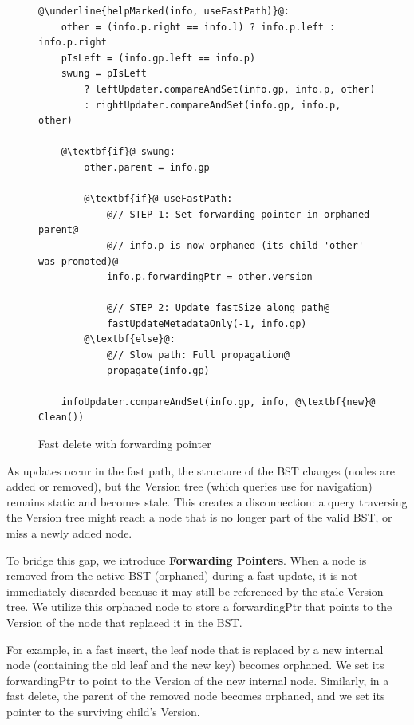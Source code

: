 \documentclass[acmsmall,screen,nonacm]{acmart}
\newcommand{\codestyle}[1]{{{\fontsize{9}{10}\ttfamily #1}}}
\begin{document}
\begin{figure}[H]
\begin{lstlisting}
@\underline{helpMarked(info, useFastPath)}@:
    other = (info.p.right == info.l) ? info.p.left : info.p.right
    pIsLeft = (info.gp.left == info.p)
    swung = pIsLeft
        ? leftUpdater.compareAndSet(info.gp, info.p, other)
        : rightUpdater.compareAndSet(info.gp, info.p, other)
    
    @\textbf{if}@ swung:
        other.parent = info.gp
        
        @\textbf{if}@ useFastPath:
            @// STEP 1: Set forwarding pointer in orphaned parent@
            @// info.p is now orphaned (its child 'other' was promoted)@
            info.p.forwardingPtr = other.version
            
            @// STEP 2: Update fastSize along path@
            fastUpdateMetadataOnly(-1, info.gp)
        @\textbf{else}@:
            @// Slow path: Full propagation@
            propagate(info.gp)
    
    infoUpdater.compareAndSet(info.gp, info, @\textbf{new}@ Clean())
\end{lstlisting}
\caption{Fast delete with forwarding pointer}
\label{fig:fast-delete-forwarding}
\end{figure}

As updates occur in the fast path, the structure of the BST changes (nodes are added or removed), but the Version tree (which queries use for navigation) remains static and becomes stale. This creates a disconnection: a query traversing the Version tree might reach a node that is no longer part of the valid BST, or miss a newly added node.

To bridge this gap, we introduce \textbf{Forwarding Pointers}. When a node is removed from the active BST (orphaned) during a fast update, it is not immediately discarded because it may still be referenced by the stale Version tree. We utilize this orphaned node to store a \codestyle{forwardingPtr} that points to the \codestyle{Version} of the node that replaced it in the BST.

For example, in a fast insert, the leaf node that is replaced by a new internal node (containing the old leaf and the new key) becomes orphaned. We set its \codestyle{forwardingPtr} to point to the \codestyle{Version} of the new internal node. Similarly, in a fast delete, the parent of the removed node becomes orphaned, and we set its pointer to the surviving child's \codestyle{Version}.
\end{document}
